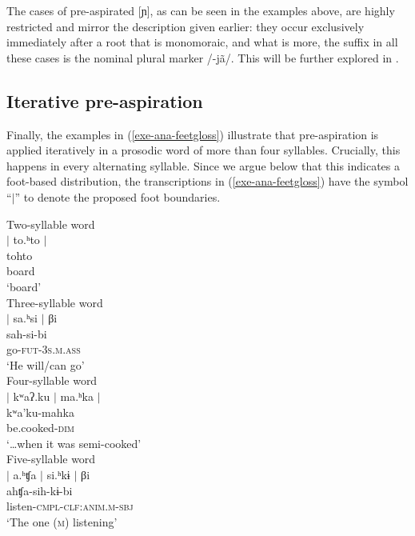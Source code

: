 \documentclass[output=paper]{langscibook}
\begin{document}
The cases of pre-aspirated [ɲ], as can be seen in the examples above, are highly restricted and mirror the description given earlier: they occur exclusively immediately after a root that is monomoraic, and what is more, the suffix in all these cases is the nominal plural marker /-jã/. This will be further explored in .

\subsection{Iterative pre-aspiration}\label{sec-foot}
Finally, the examples in (\ref{exe-ana-feetgloss}) illustrate that pre-aspiration is applied iteratively in a prosodic word of more than four syllables. Crucially, this happens in every alternating syllable. Since we argue below that this indicates a foot-based distribution, the transcriptions in (\ref{exe-ana-feetgloss}) have the symbol ``$|$'' to denote the proposed foot boundaries. 

\newpage
\begin{exe}
\ex\label{exe-ana-feetgloss}
\begin{xlist}
\ex Two-syllable word\\
\glll $|${ }to.ʰto{ }$|$ \\
tohto\\
board\\
\trans `board'\\
{\citep[105]{Bruil:2014}}
\ex Three-syllable word\\
\glll $|${ }sa.ʰsi{ }$|${ }βi\\
sah-si-bi\\
go-\textsc{fut-3s.m.ass}\\
\trans `He will/can go'\\
{\citep[197]{Bruil:2014}}
\ex Four-syllable word\\
\glll $|${ }kʷaʔ.ku{ }$|${ }ma.ʰka{ }$|$\\
kʷa'ku-mahka\\
be.cooked-\textsc{dim}\\
\trans `\ldots when it was semi-cooked'\\
{\citep[165]{Bruil:2014}}
\ex Five-syllable word\\
\glll $|${ }a.ʰʧa{ }$|${ }si.ʰkɨ{ }$|${ }βi\\
ahʧa-sih-kɨ-bi\\
listen-\textsc{cmpl-clf:anim.m-sbj}\\
\trans `The one (\textsc{m}) listening'\\
{\citep[20120918elicr004]{Bruil:2012}}
\end{xlist}
\end{exe}
\end{document}
